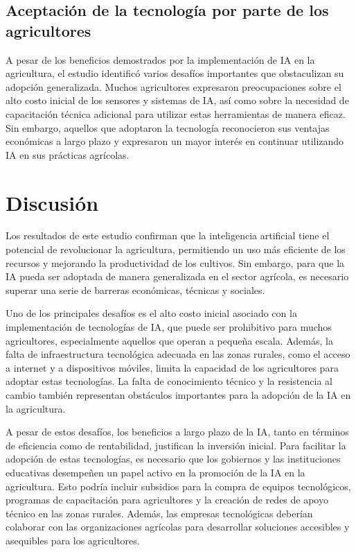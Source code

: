 \documentclass[9pt,twocolumn,twoside]{opticajnl}
\begin{document}
\subsection{Aceptación de la tecnología por parte de los agricultores}
A pesar de los beneficios demostrados por la implementación de IA en la agricultura, el estudio identificó varios desafíos importantes que obstaculizan su adopción generalizada. Muchos agricultores expresaron preocupaciones sobre el alto costo inicial de los sensores y sistemas de IA, así como sobre la necesidad de capacitación técnica adicional para utilizar estas herramientas de manera eficaz. Sin embargo, aquellos que adoptaron la tecnología reconocieron sus ventajas económicas a largo plazo y expresaron un mayor interés en continuar utilizando IA en sus prácticas agrícolas.

\section{Discusión}
Los resultados de este estudio confirman que la inteligencia artificial tiene el potencial de revolucionar la agricultura, permitiendo un uso más eficiente de los recursos y mejorando la productividad de los cultivos. Sin embargo, para que la IA pueda ser adoptada de manera generalizada en el sector agrícola, es necesario superar una serie de barreras económicas, técnicas y sociales.

Uno de los principales desafíos es el alto costo inicial asociado con la implementación de tecnologías de IA, que puede ser prohibitivo para muchos agricultores, especialmente aquellos que operan a pequeña escala. Además, la falta de infraestructura tecnológica adecuada en las zonas rurales, como el acceso a internet y a dispositivos móviles, limita la capacidad de los agricultores para adoptar estas tecnologías. La falta de conocimiento técnico y la resistencia al cambio también representan obstáculos importantes para la adopción de la IA en la agricultura.

A pesar de estos desafíos, los beneficios a largo plazo de la IA, tanto en términos de eficiencia como de rentabilidad, justifican la inversión inicial. Para facilitar la adopción de estas tecnologías, es necesario que los gobiernos y las instituciones educativas desempeñen un papel activo en la promoción de la IA en la agricultura. Esto podría incluir subsidios para la compra de equipos tecnológicos, programas de capacitación para agricultores y la creación de redes de apoyo técnico en las zonas rurales. Además, las empresas tecnológicas deberían colaborar con las organizaciones agrícolas para desarrollar soluciones accesibles y asequibles para los agricultores.
\end{document}
